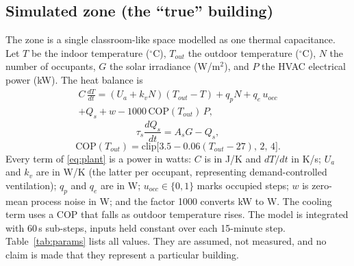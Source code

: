 \documentclass[conference]{IEEEtran}
\newcommand{\degC}{\ensuremath{^{\circ}}C}
\begin{document}
\subsection{Simulated zone (the ``true'' building)}\label{sec:plant}
The zone is a single classroom-like space modelled as one thermal capacitance. Let $T$ be the indoor temperature (\degC), $T_{out}$ the outdoor temperature (\degC), $N$ the number of occupants, $G$ the solar irradiance (W/m$^2$), and $P$ the HVAC electrical power (kW). The heat balance is
\begin{multline}
C\,\frac{dT}{dt}=(U_a+k_vN)(T_{out}-T)+q_pN+q_e\,u_{occ}\\
+Q_s+w-1000\,\mathrm{COP}(T_{out})\,P,
\label{eq:plant}
\end{multline}
\begin{equation}
\tau_s\frac{dQ_s}{dt}=A_sG-Q_s,
\label{eq:solar}
\end{equation}
\begin{equation}
\mathrm{COP}(T_{out})=\mathrm{clip}\big[3.5-0.06(T_{out}-27),\,2,\,4\big].
\label{eq:cop}
\end{equation}
Every term of \eqref{eq:plant} is a power in watts: $C$ is in J/K and $dT/dt$ in K/s; $U_a$ and $k_v$ are in W/K (the latter per occupant, representing demand-controlled ventilation); $q_p$ and $q_e$ are in W; $u_{occ}\in\{0,1\}$ marks occupied steps; $w$ is zero-mean process noise in W; and the factor 1000 converts kW to W. The cooling term uses a COP that falls as outdoor temperature rises. The model is integrated with 60\,s sub-steps, inputs held constant over each 15-minute step. Table~\ref{tab:params} lists all values. They are assumed, not measured, and no claim is made that they represent a particular building.
\end{document}
